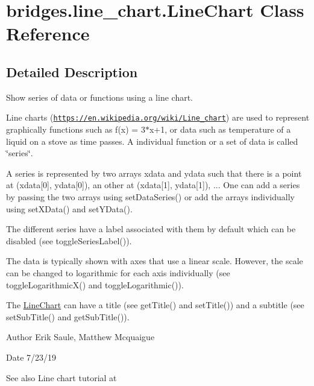 \hypertarget{classbridges_1_1line__chart_1_1_line_chart}{}\section{bridges.\+line\+\_\+chart.\+Line\+Chart Class Reference}
\label{classbridges_1_1line__chart_1_1_line_chart}


\subsection{Detailed Description}
Show series of data or functions using a line chart. 

Line charts (\href{https://en.wikipedia.org/wiki/Line_chart}{\tt https\+://en.\+wikipedia.\+org/wiki/\+Line\+\_\+chart}) are used to represent graphically functions such as f(x) = 3$\ast$x+1, or data such as temperature of a liquid on a stove as time passes. A individual function or a set of data is called \char`\"{}series\char`\"{}.

A series is represented by two arrays xdata and ydata such that there is a point at (xdata\mbox{[}0\mbox{]}, ydata\mbox{[}0\mbox{]}), an other at (xdata\mbox{[}1\mbox{]}, ydata\mbox{[}1\mbox{]}), ... One can add a series by passing the two arrays using set\+Data\+Series() or add the arrays individually using set\+X\+Data() and set\+Y\+Data().

The different series have a label associated with them by default which can be disabled (see toggle\+Series\+Label()).

The data is typically shown with axes that use a linear scale. However, the scale can be changed to logarithmic for each axis individually (see toggle\+Logarithmic\+X() and toggle\+Logarithmic()).

The \hyperlink{classbridges_1_1line__chart_1_1_line_chart}{Line\+Chart} can have a title (see get\+Title() and set\+Title()) and a subtitle (see set\+Sub\+Title() and get\+Sub\+Title()).

\begin{DoxyAuthor}{Author}
Erik Saule, Matthew Mcquaigue
\end{DoxyAuthor}
\begin{DoxyDate}{Date}
7/23/19
\end{DoxyDate}
\begin{DoxySeeAlso}{See also}
Line chart tutorial at 
\end{DoxySeeAlso}
